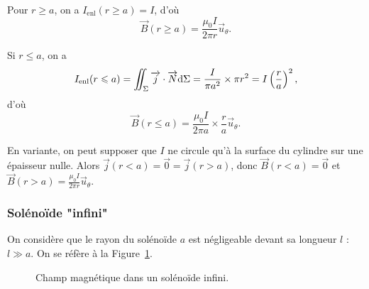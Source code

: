             Pour $r\geqslant a$, on a $I_{\text{enl}}(r\geqslant a)=I$, d'où 
            \begin{equation}
                \boxed{
                    \vec{B}(r\geqslant a)=\frac{\mu_0 I}{2\pi r}\vec{u}_{\theta}.
                }
            \end{equation}

            Si $r\leqslant a$, on a 
            \begin{equation}
                I_{\text{enl}}(r\leqslant a)=\iint_{\Sigma}\protect\overrightarrow{{j}}\cdot\protect\overrightarrow{{N}}\mathrm{d}\Sigma=\frac{I}{\pi a^{2}}\times\pi r^{2}=I\left(\frac{r}{a}\right)^{2},
            \end{equation}
            d'où
            \begin{equation}
                \boxed{
                \vec{B}(r\leqslant a)=\frac{\mu_0 I}{2\pi a}\times\frac{r}{a}\vec{u}_{\theta}.}
            \end{equation}

            En variante, on peut supposer que $I$ ne circule qu'à la surface du cylindre sur une épaisseur nulle. Alors $\vec{j}(r<a)=\vec{0}=\vec{j}(r>a)$, donc $\vec{B}(r<a)=\vec{0}$ et $\vec{B}(r>a)=\frac{\mu_0 I}{2\pi r}\vec{u}_{\theta}$.

        \subsubsection{Solénoïde "infini"}

            On considère que le rayon du solénoïde $a$ est négligeable devant sa longueur $l$ : $l\gg a$. On se réfère à la Figure~\ref{fig:solenoide_infini_champ_B}.

            \begin{figure}
                \centering
                \caption{Champ magnétique dans un solénoïde infini.}    
                \label{fig:solenoide_infini_champ_B}
            \end{figure}

